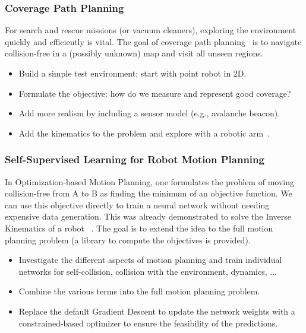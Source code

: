 \documentclass[a4paper]{article}
\begin{document}
\subsubsection{Coverage Path Planning}
For search and rescue missions (or vacuum cleaners), exploring the environment quickly and efficiently is vital. 
The goal of coverage path planning~\cite{Jonnarth2023lcoverage} is to navigate collision-free in a (possibly unknown) map and visit all unseen regions. 
\begin{itemize}
	\item Build a simple test environment; start with point robot in 2D.
	\item Formulate the objective: how do we measure and represent good coverage?
	\item Add more realism by including a sensor model (e.g., avalanche beacon). 
    \item Add the kinematics to the problem and explore with a robotic arm~\cite{Meli2025RobotExploration}.  
\end{itemize}


\subsubsection{Self-Supervised Learning for Robot Motion Planning}
In Optimization-based Motion Planning, one formulates the problem of moving collision-free from A to B as 
finding the minimum of an objective function. 
We can use this objective directly to train a neural network without needing expensive data generation. 
This was already demonstrated to solve the Inverse Kinematics of a robot ~\cite{Tenhumberg2023ik}. 
The goal is to extend the idea to the full motion planning problem (a library to compute the objectives is provided).
\begin{itemize}
	\item Investigate the different aspects of motion planning and train individual networks for self-collision, collision with the environment, dynamics, ...  
	\item Combine the various terms into the full motion planning problem.
	\item Replace the default Gradient Descent to update the network weights with a constrained-based optimizer to ensure the feasibility of the predictions.
\end{itemize}
\end{document}
